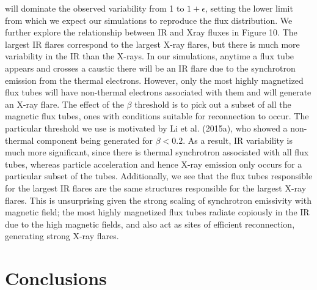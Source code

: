will dominate the observed variability from 1 to $1+\epsilon$,
setting the lower limit from which we expect our simulations to reproduce the flux distribution.
We further explore the relationship between IR and Xray fluxes in Figure 10. The largest IR flares correspond
to the largest X-ray flares, but there is much more variability in the IR than the X-rays. In our simulations,
anytime a flux tube appears and crosses a caustic there
will be an IR flare due to the synchrotron emission from
the thermal electrons. However, only the most highly
magnetized flux tubes will have non-thermal electrons
associated with them and will generate an X-ray flare.
The effect of the $\beta$ threshold is to pick out a subset of all
the magnetic flux tubes, ones with conditions suitable for
reconnection to occur. The particular threshold we use is
motivated by Li et al. (2015a), who showed a non-thermal
component being generated for $\beta < 0.2$. As a result, IR
variability is much more significant, since there is thermal synchrotron associated with all flux tubes, whereas
particle acceleration and hence X-ray emission only occurs for a particular subset of the tubes. Additionally,
we see that the flux tubes responsible for the largest IR
flares are the same structures responsible for the largest
X-ray flares. This is unsurprising given the strong scaling
of synchrotron emissivity with magnetic field; the most
highly magnetized flux tubes radiate copiously in the IR
due to the high magnetic fields, and also act as sites of
efficient reconnection, generating strong X-ray flares.
\section{Conclusions}